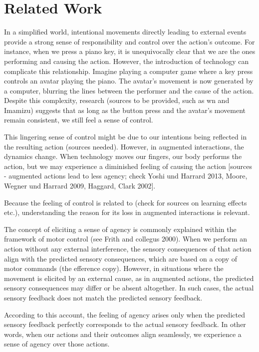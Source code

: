 \section{Related Work}
In a simplified world, intentional movements directly leading to external events provide a strong sense of responsibility and control over the action's outcome. For instance, when we press a piano key, it is unequivocally clear that we are the ones performing and causing the action. However, the introduction of technology can complicate this relationship. Imagine playing a computer game where a key press controls an avatar playing the piano. The avatar's movement is now generated by a computer, blurring the lines between the performer and the cause of the action. Despite this complexity, research (sources to be provided, such as wn and Imamizu) suggests that as long as the button press and the avatar's movement remain consistent, we still feel a sense of control.

This lingering sense of control might be due to our intentions being reflected in the resulting action (sources needed). However, in augmented interactions, the dynamics change. When technology moves our fingers, our body performs the action, but we may experience a diminished feeling of causing the action [sources - augmented actions lead to less agency; check Yoshi und Harrard 2013, Moore, Wegner und Harrard 2009, Haggard, Clark 2002].

Because the feeling of control is related to (check for sources on learning effects etc.), understanding the reason for its loss in augmented interactions is relevant. 


The concept of eliciting a sense of agency is commonly explained within the framework of motor control (see Frith and collegus 2000). When we perform an action without any external interference, the sensory consequences of that action align with the predicted sensory consequences, which are based on a copy of motor commands (the efference copy). However, in situations where the movement is elicited by an external cause, as in augmented actions, the predicted sensory consequences may differ or be absent altogether. In such cases, the actual sensory feedback does not match the predicted sensory feedback.

According to this account, the feeling of agency arises only when the predicted sensory feedback perfectly corresponds to the actual sensory feedback. In other words, when our actions and their outcomes align seamlessly, we experience a sense of agency over those actions.

